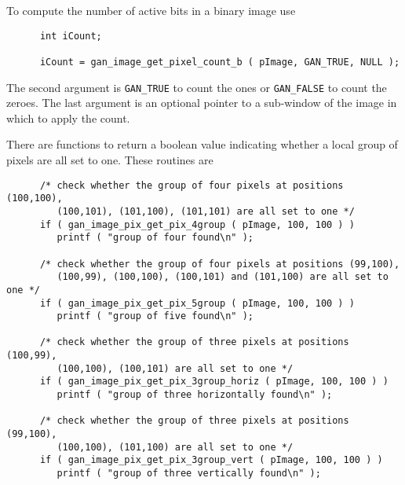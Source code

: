 To compute the number of active bits in a binary image use
\begin{verbatim}
      int iCount;

      iCount = gan_image_get_pixel_count_b ( pImage, GAN_TRUE, NULL );
\end{verbatim}
The second argument is {\tt GAN\_TRUE} to count the ones or {\tt GAN\_FALSE}
to count the zeroes. The last argument is an optional pointer to a
sub-window of the image in which to apply the count.

There are functions to return a boolean value indicating whether a local
group of pixels are all set to one. These routines are
\begin{verbatim}
      /* check whether the group of four pixels at positions (100,100),
         (100,101), (101,100), (101,101) are all set to one */
      if ( gan_image_pix_get_pix_4group ( pImage, 100, 100 ) )
         printf ( "group of four found\n" );

      /* check whether the group of four pixels at positions (99,100),
         (100,99), (100,100), (100,101) and (101,100) are all set to one */
      if ( gan_image_pix_get_pix_5group ( pImage, 100, 100 ) )
         printf ( "group of five found\n" );

      /* check whether the group of three pixels at positions (100,99),
         (100,100), (100,101) are all set to one */
      if ( gan_image_pix_get_pix_3group_horiz ( pImage, 100, 100 ) )
         printf ( "group of three horizontally found\n" );

      /* check whether the group of three pixels at positions (99,100),
         (100,100), (101,100) are all set to one */
      if ( gan_image_pix_get_pix_3group_vert ( pImage, 100, 100 ) )
         printf ( "group of three vertically found\n" );
\end{verbatim}

